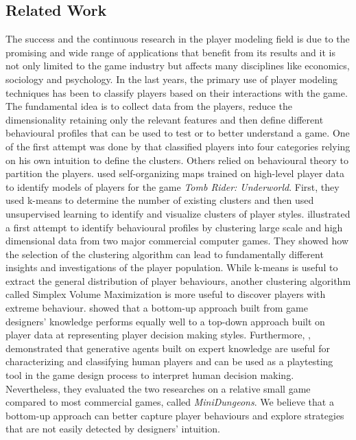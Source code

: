 \subsection{Related Work}
The success and the continuous research in the player modeling field is due to the promising and wide range of applications that benefit from its results and it is not only limited to the game industry but affects many disciplines like economics, sociology and psychology. In the last years, the primary use of player modeling techniques has been to classify players based on their interactions with the game. The fundamental idea is to collect data from the players, reduce the dimensionality retaining only the relevant features and then define different behavioural profiles that can be used to test or to better understand a game. One of the first attempt was done by \textcite{bartle_hearts_1996} that classified players into four categories relying on his own intuition to define the clusters. Others \cite{thue_interactive_2007,bateman_21st_2005} relied on behavioural theory to partition the players. \textcite{drachen_player_2009} used self-organizing maps trained on high-level player data to identify models of players for the game \textit{Tomb Rider: Underworld}. First, they used k-means to determine the number of existing clusters and then used unsupervised learning to identify and visualize clusters of player styles. \textcite{drachen_guns_2012} illustrated a first attempt to identify behavioural profiles by clustering large scale and high dimensional data from two major commercial computer games. They showed how the selection of the clustering algorithm can lead to fundamentally different insights and investigations of the player population.  While k-means is useful to extract the general distribution of player behaviours, another clustering algorithm called Simplex Volume Maximization is more useful to discover players with extreme behaviour. \textcite{holmgard_evolving_2016} showed that a bottom-up approach built from game designers' knowledge performs equally well to a top-down approach built on player data at representing player decision making styles. Furthermore, \textcite{holmgard_generative_2014-1}, demonstrated that generative agents built on expert knowledge are useful for characterizing and classifying human players and can be used as a playtesting tool in the game design process to interpret human decision making. Nevertheless, they evaluated the two researches on a relative small game compared to most commercial games, called \textit{MiniDungeons}. We believe that a bottom-up approach can better capture player behaviours and explore strategies that are not easily detected by designers' intuition. 

